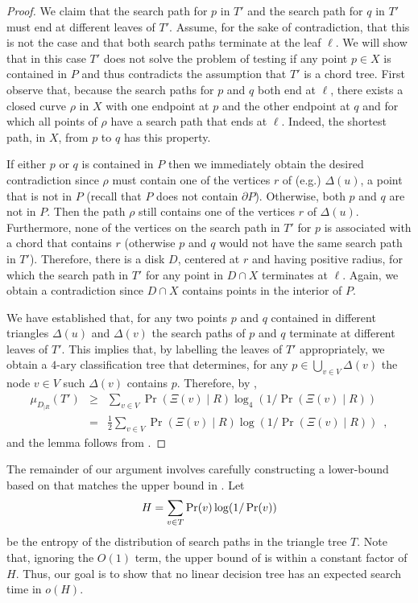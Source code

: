 \documentclass[charterfonts,lotsofwhite]{patmorin}
\newcommand{\boundary}{\partial}
\begin{document}
\begin{proof}
We claim that the search path for $p$ in $T'$ and the search path for
$q$ in $T'$ must end at different leaves of $T'$.  Assume, for the
sake of contradiction, that this is not the case and that both search
paths terminate at the leaf $\ell$. We will show that in this case
$T'$ does not solve the problem of testing if any point $p\in X$ is
contained in $P$ and thus contradicts the assumption that $T'$ is a
chord tree.  First observe that, because the search paths for $p$ and
$q$ both end at $\ell$, there exists a closed curve $\rho$ in $X$ with
one endpoint at $p$ and the other endpoint at $q$ and for which all
points of $\rho$ have a search path that ends at $\ell$.  Indeed, the
shortest path, in $X$, from $p$ to $q$ has this property.

If either $p$ or $q$ is contained in $P$ then we immediately obtain
the desired contradiction since $\rho$ must contain one of the
vertices $r$ of (e.g.) $\Delta(u)$, a point that is not in $P$ (recall
that $P$ does not contain $\boundary P$).  Otherwise, both $p$ and $q$
are not in $P$.  Then the path $\rho$ still contains one of the
vertices $r$ of $\Delta(u)$.  Furthermore, none of the vertices on the
search path in $T'$ for $p$ is associated with a chord that contains
$r$ (otherwise $p$ and $q$ would not have the same search path in
$T'$).  Therefore, there is a disk $D$, centered at $r$ and having
positive radius, for which the search path in $T'$ for any point in
$D\cap X$ terminates at $\ell$.  Again, we obtain a contradiction
since $D\cap X$ contains points in the interior of $P$.

We have established that, for any two points $p$ and $q$
contained in different triangles $\Delta(u)$ and $\Delta(v)$ the
search paths of $p$ and $q$ terminate at different leaves of $T'$.
This implies that, by labelling the leaves of $T'$ appropriately, we
obtain a $4$-ary classification tree that determines, for any
$p\in \bigcup_{v\in V} \Delta(v)$ the node $v\in V$ such
$\Delta(v)$ contains $p$.  Therefore, by ,
\begin{eqnarray*}
  \mu_{D_{|R}} (T') 
   &\ge& \sum_{v\in V}\Pr(\Xi(v)\mid R)\log_4(1/\Pr(\Xi(v)\mid R)) \\
   &=& \frac{1}{2}\sum_{v\in V}\Pr(\Xi(v)\mid R)\log(1/\Pr(\Xi(v)\mid R)) \enspace ,
\end{eqnarray*}
and the lemma follows from .
\end{proof}

The remainder of our argument involves carefully constructing a
lower-bound based on  that matches the upper bound
in .  Let 
\begin{equation}
   H = \sum_{v\in T} \Pr(v)\log (1/\Pr(v)) \eqlabel{H}
\end{equation}
be the entropy of the distribution of search paths in the triangle
tree $T$.  Note that,
ignoring the $O(1)$ term,
the upper bound of  is within a constant factor of
$H$. Thus, our goal is to show that no linear decision tree has an
expected search time in $o(H)$.
\end{document}
